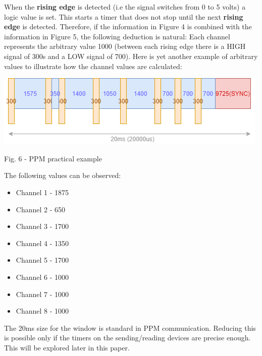 \documentclass{IEEEtran}
\begin{document}
When the \textbf{rising edge} is detected (i.e the signal switches from 0 to 5 volts) a logic value is set. This starts a timer that does not stop until the next \textbf{rising edge} is detected. Therefore, if the information in Figure 4 is combined with the information in Figure 5, the following deduction is natural: Each channel represents the arbitrary value 1000 (between each rising edge there is a HIGH signal of 300{\mu}s and a LOW signal of 700). Here is yet another example of arbitrary values to illustrate how the channel values are calculated:
\newline
\begin{center}\includegraphics[scale=.5]{ppm3.png}\end{center}
\begin{it}\begin{center}Fig. 6 - PPM practical example\end{center}\end{it}
The following values can be observed:
\begin{multicols}{2}
\begin{itemize}
    \item Channel 1 - 1875
    \item Channel 2 - 650
    \item Channel 3 - 1700
    \item Channel 4 - 1350
    \item Channel 5 - 1700
    \item Channel 6 - 1000
    \item Channel 7 - 1000
    \item Channel 8 - 1000
\end{itemize}
\end{multicols}
The 20ms size for the window is standard in PPM communication. Reducing this is possible only if the timers on the sending/reading devices are precise enough. This will be explored later in this paper.
\end{document}
